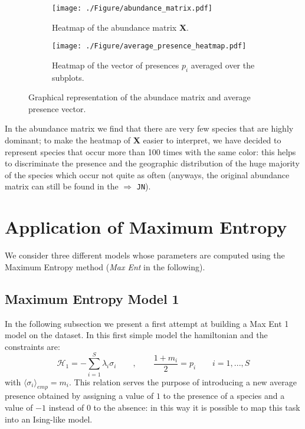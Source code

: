 \documentclass[a4paper,11pt]{article}
\begin{document}
\begin{figure}[htp]
\centering
\begin{subfigure}[t]{0.49\textwidth}
    \centering
    \texttt{[image: ./Figure/abundance\_matrix.pdf]}
    \caption{Heatmap of the abundance matrix \textbf{X}.}
    \label{fig:abundance_matrix_heatmap}
\end{subfigure}
\begin{subfigure}[t]{0.49\textwidth}
    \centering
    \texttt{[image: ./Figure/average\_presence\_heatmap.pdf]}
    \caption{Heatmap of the vector of presences $p_i$ averaged over the subplots.}
    \label{fig:average_presence_heatmap}
\end{subfigure}
\caption{Graphical representation of the abundace matrix and average presence vector.}
\label{fig:species_heatmaps}
\end{figure}

In the abundance matrix we find that there are very few species that are highly dominant; to make the heatmap of \textbf{X} easier to interpret, we have decided to represent species that occur more than 100 times with the same color: this helps to discriminate the presence and the geographic distribution of the huge majority of the species which occur not quite as often (anyways, the original abundance matrix can still be found in the $\Rightarrow$ \texttt{JN}).


\section{Application of Maximum Entropy}

We consider three different models whose parameters are computed using the Maximum Entropy method (\emph{Max Ent} in the following).


\subsection{Maximum Entropy Model 1}

In the following subsection we present a first attempt at building a Max Ent 1 model on the dataset. In this first simple model the hamiltonian and the constraints are:
\begin{equation}
    \label{eq:MaxEnt1}
    \mathcal{H}_1 = -\sum_{i=1}^S \lambda_i \sigma_i \qquad,\qquad \frac{1+m_i}{2}= p_i  \qquad i=1,...,S
\end{equation}
with $\bigl\langle \sigma_i \bigr\rangle _{emp} = m_i$. This relation serves the purpose of introducing a new average presence obtained by assigning a value of $1$ to the presence of a species and a value of $-1$ instead of $0$ to the absence: in this way it is possible to map this task into an Ising-like model.
\end{document}
